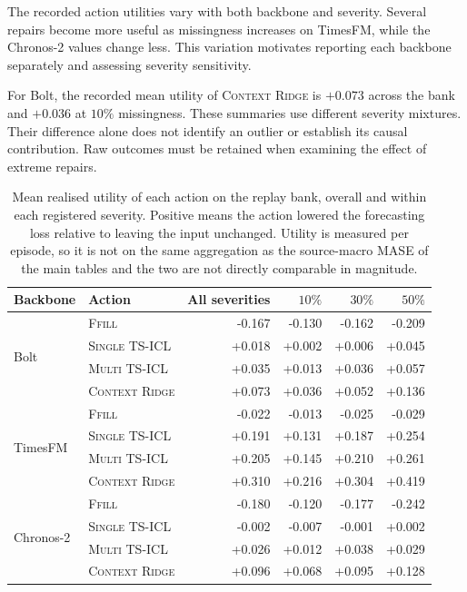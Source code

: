 \documentclass{article}
\begin{document}
The recorded action utilities vary with both backbone and severity. Several repairs become
more useful as missingness increases on TimesFM, while the Chronos-2 values change less.
This variation motivates reporting each backbone separately and assessing severity sensitivity.

For Bolt, the recorded mean utility of \textsc{Context Ridge} is $+0.073$ across the bank
and $+0.036$ at $10\%$ missingness. These summaries use different severity mixtures.
Their difference alone does not identify an outlier or establish its causal contribution.
Raw outcomes must be retained when examining the effect of extreme repairs.

\begin{table}[!t]
  \caption{Mean realised utility of each action on the replay bank, overall and within each
  registered severity. Positive means the action lowered the forecasting loss relative to
  leaving the input unchanged. Utility is measured per episode, so it is not on the same
  aggregation as the source-macro MASE of the main tables and the two are not directly
  comparable in magnitude.}
  \label{tab:app-utility-severity}
  \centering
  \small
  \setlength{\tabcolsep}{4pt}
\begin{tabular*}{\textwidth}{@{\extracolsep{\fill}}llrrrr@{}}
    \toprule
    Backbone & Action & All severities & $10\%$ & $30\%$ & $50\%$ \\
    \midrule
    \multirow{4}{*}{Bolt}
      & \textsc{Ffill}         & -0.167  & -0.130  & -0.162  & -0.209 \\
      & \textsc{Single TS-ICL} & +0.018 & +0.002 & +0.006 & +0.045 \\
      & \textsc{Multi TS-ICL}  & +0.035  & +0.013  & +0.036  & +0.057 \\
      & \textsc{Context Ridge} & +0.073  & +0.036  & +0.052  & +0.136 \\
    \midrule
    \multirow{4}{*}{TimesFM}
      & \textsc{Ffill}         & -0.022  & -0.013  & -0.025  & -0.029 \\
      & \textsc{Single TS-ICL} & +0.191 & +0.131 & +0.187 & +0.254 \\
      & \textsc{Multi TS-ICL}  & +0.205  & +0.145  & +0.210  & +0.261 \\
      & \textsc{Context Ridge} & +0.310  & +0.216  & +0.304  & +0.419 \\
    \midrule
    \multirow{4}{*}{Chronos-2}
      & \textsc{Ffill}         & -0.180  & -0.120  & -0.177  & -0.242 \\
      & \textsc{Single TS-ICL} & -0.002 & -0.007 & -0.001 & +0.002 \\
      & \textsc{Multi TS-ICL}  & +0.026  & +0.012  & +0.038  & +0.029 \\
      & \textsc{Context Ridge} & +0.096  & +0.068  & +0.095  & +0.128 \\
    \bottomrule
  \end{tabular*}
\end{table}
\end{document}
